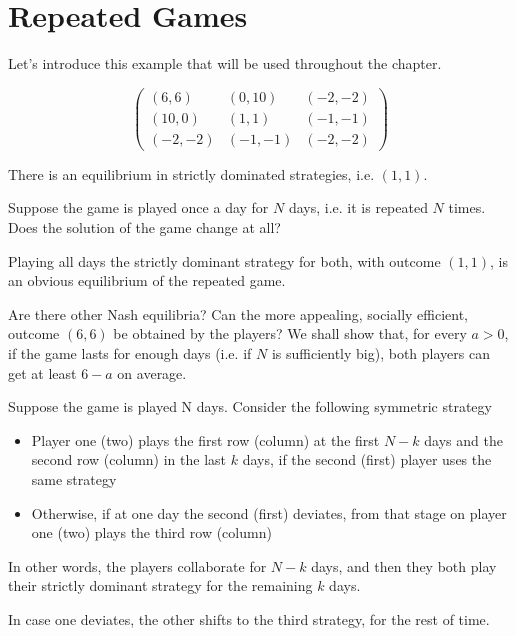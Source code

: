 \documentclass[../main.tex]{subfiles}
\begin{document}
\chapter{Repeated Games}
\begin{example}
    Let's introduce this example that will be used throughout the chapter.

    \[
        \begin{pmatrix}
            (6,6)   & (0,10)  & (-2,-2) \\
            (10,0)  & (1,1)   & (-1,-1) \\
            (-2,-2) & (-1,-1) & (-2,-2)
        \end{pmatrix}
    \]
\end{example}
There is an equilibrium in strictly dominated strategies, i.e. $(1,1)$.

Suppose the game is played once a day for $N$ days, i.e. it is repeated $N$ times. Does the solution of the game change at all?

Playing all days the strictly dominant strategy for both, with outcome $(1,1)$, is an
obvious equilibrium of the repeated game.

Are there other Nash equilibria? Can the more appealing, socially efficient, outcome $(6,6)$ be obtained by the players? We shall show that, for every $a > 0$, if the game lasts for enough days (i.e. if $N$ is sufficiently big), both players can get at least $6-a$ on average.

Suppose the game is played N days. Consider the following symmetric strategy
\begin{itemize}
    \item Player one (two) plays the first row (column) at the first $N-k$ days and the second row (column) in the last $k$ days, if the second (first) player uses the same strategy
    \item Otherwise, if at one day the second (first) deviates, from that stage on player one (two) plays the third row (column)
\end{itemize}
In other words, the players collaborate for $N-k$ days, and then they both play their strictly dominant strategy for the remaining $k$ days.

In case one deviates, the other shifts to the third strategy, for the rest of time.
\end{document}
